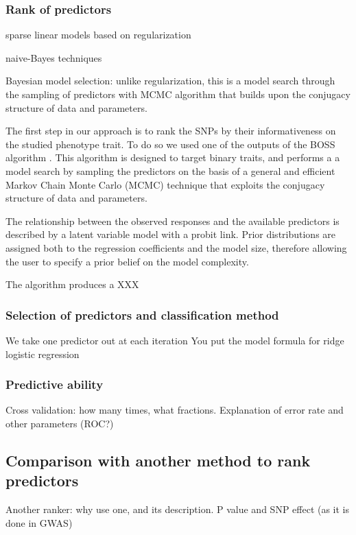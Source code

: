 \subsubsection{Rank of predictors}
\label{par:boss}
sparse linear models based on regularization

naive-Bayes techniques

Bayesian model selection: unlike regularization, this is a model search
through the sampling of predictors with MCMC algorithm that builds upon
the conjugacy structure of data and parameters.

 
The first step in our approach is to rank the SNPs by their informativeness
on the studied phenotype trait. To do so we used one of the outputs of
the BOSS algorithm \cite{russu2012stochastic}. This algorithm is designed
to target binary traits, and performs a 
a model search by sampling the predictors on the
basis of a general and efficient Markov Chain
Monte Carlo (MCMC) technique that exploits the
conjugacy structure of data and parameters.

The relationship between the observed
responses and the available predictors is described
by a latent variable model with a probit link. Prior 
distributions are assigned both to
the regression coefficients and the model size,
therefore allowing the user to specify a prior
belief on the model complexity. 

The algorithm produces a XXX

\subsubsection{Selection of predictors and classification method}
\label{par:predictor_selection}
We take one predictor out at each iteration
You put the model formula for ridge logistic regression

\subsubsection{Predictive ability}
\label{par:estimating_error}
Cross validation: how many times, what fractions. 
Explanation of error rate and other parameters (ROC?)

\subsection{Comparison with another method to rank predictors}
\label{sec:other_ranker}
Another ranker: why use one, and its description.
P value and SNP effect (as it is done in GWAS)


